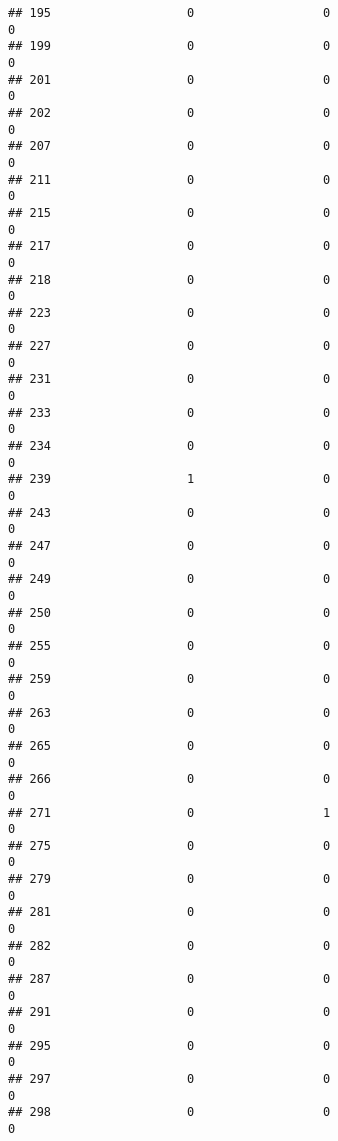 \documentclass[
]{article}
\begin{document}
\begin{verbatim}
## 195                   0                  0                              0
## 199                   0                  0                              0
## 201                   0                  0                              0
## 202                   0                  0                              0
## 207                   0                  0                              0
## 211                   0                  0                              0
## 215                   0                  0                              0
## 217                   0                  0                              0
## 218                   0                  0                              0
## 223                   0                  0                              0
## 227                   0                  0                              0
## 231                   0                  0                              0
## 233                   0                  0                              0
## 234                   0                  0                              0
## 239                   1                  0                              0
## 243                   0                  0                              0
## 247                   0                  0                              0
## 249                   0                  0                              0
## 250                   0                  0                              0
## 255                   0                  0                              0
## 259                   0                  0                              0
## 263                   0                  0                              0
## 265                   0                  0                              0
## 266                   0                  0                              0
## 271                   0                  1                              0
## 275                   0                  0                              0
## 279                   0                  0                              0
## 281                   0                  0                              0
## 282                   0                  0                              0
## 287                   0                  0                              0
## 291                   0                  0                              0
## 295                   0                  0                              0
## 297                   0                  0                              0
## 298                   0                  0                              0

\end{verbatim}
\end{document}
